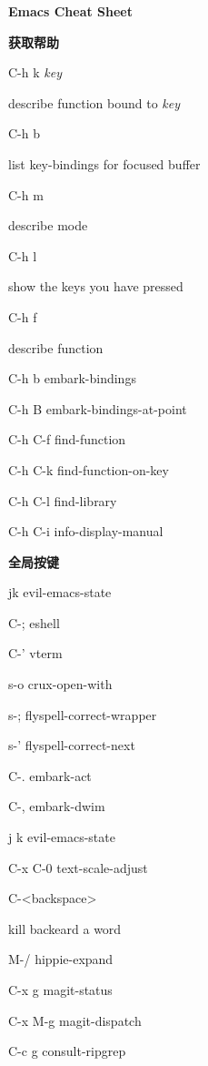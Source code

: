 \documentclass[10pt]{article}
\renewcommand\section[1]{\bigskip\par\textbf{\color{heading}\large#1}\smallskip}
\newcommand\humanreadable[1]{{\par\color{default}\small\sffamily#1}}
\newcommand\meta[1]{\textlangle\textit{#1}\textrangle}
\begin{document}
\begin{CJK}{UTF8}{gbsn}
\begin{multicols}{3}

  \setlength{\columnsep}{1cm}
  \begin{center}
    \LARGE\color{heading}\textbf{Emacs Cheat Sheet}
  \end{center}

  \section{获取帮助}
  \begin{keylist}
  \item[C-h k \meta{key}] \humanreadable{describe function bound to \meta{key}}
  \item[C-h b] \humanreadable{list key-bindings for focused buffer}
  \item[C-h m] \humanreadable{describe mode}
  \item[C-h l] \humanreadable{show the keys you have pressed}
  \item[C-h f] \humanreadable{describe function}
  \item[C-h b] embark-bindings
  \item[C-h B] embark-bindings-at-point
  \item[C-h C-f] find-function
  \item[C-h C-k] find-function-on-key
  \item[C-h C-l] find-library
  \item[C-h C-i] info-display-manual
  \end{keylist}

  \section{全局按键}
  \begin{keylist}
  \item[jk] evil-emacs-state
  \item[C-;] eshell
  \item[C-'] vterm
  \item[s-o] crux-open-with
  \item[s-;] flyspell-correct-wrapper
  \item[s-'] flyspell-correct-next
  \item[C-.] embark-act
  \item[C-,] embark-dwim
  \item[j k] evil-emacs-state
  \item[C-x C-0] text-scale-adjust
  \item[C-<backspace>] \humanreadable{kill backeard a word}
  \item[M-/] hippie-expand
  \item[C-x g] magit-status
  \item[C-x M-g] magit-dispatch
  \item[C-c g] consult-ripgrep
  \end{keylist}


\end{multicols}
\end{CJK}
\end{document}

